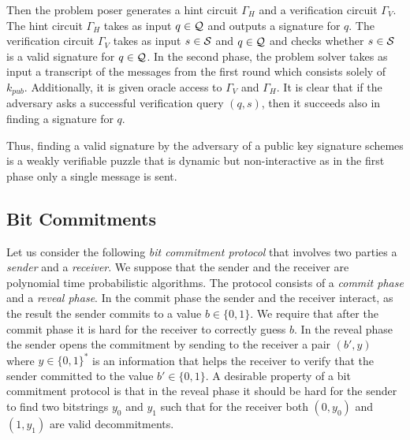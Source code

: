 Then the problem poser generates a hint circuit $\Gamma_H$ and a verification circuit $\Gamma_V$.
The hint circuit $\Gamma_H$ takes as input $q \in \mathcal{Q}$ and outputs a signature for $q$. The verification circuit
$\Gamma_V$ takes as input $s \in \mathcal{S}$ and $q \in \mathcal{Q}$ and checks whether $s \in \mathcal{S}$ is a valid signature for $q \in \mathcal{Q}$.
In the second phase, the problem solver takes as input a transcript of the messages from the first round which consists solely of $k_{pub}$.
Additionally, it is given oracle access to $\Gamma_V$ and $\Gamma_H$.
It is clear that if the adversary asks a successful verification query $(q,s)$, then it succeeds also in finding a signature for $q$.

Thus, finding a valid signature by the adversary of a public key signature schemes is a weakly verifiable puzzle that
is dynamic but non-interactive as in the first phase only a single message is sent.
%
\subsection{Bit Commitments}
Let us consider the following \textit{bit commitment protocol} that involves two parties a \textit{sender} and a \textit{receiver}.
We suppose that the sender and the receiver are polynomial time probabilistic algorithms.
The protocol consists of a \textit{commit phase} and a \textit{reveal phase}.
In the commit phase the sender and the receiver interact, as the result the sender commits to a value $b \in \{0,1\}$.
We require that after the commit phase it is hard for the receiver to correctly guess $b$.
In the reveal phase the sender opens the commitment by sending to the receiver a pair $(b', y)$ where $y \in \{0,1\}^{*}$ is an information
that helps the receiver to verify that the sender committed to the value $b' \in \{0,1\}$.
A desirable property of a bit commitment protocol is that in the reveal phase it
should be hard for the sender to find two bitstrings $y_0$ and $y_1$ such that
for the receiver both $(0,y_0)$ and $(1, y_1)$ are valid decommitments.

